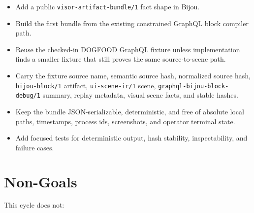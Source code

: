 \begin{itemize}
\tightlist
\item
  Add a public \texttt{v\allowbreak{}i\allowbreak{}s\allowbreak{}o\allowbreak{}r\allowbreak{}-\allowbreak{}a\allowbreak{}r\allowbreak{}t\allowbreak{}i\allowbreak{}f\allowbreak{}a\allowbreak{}c\allowbreak{}t\allowbreak{}-\allowbreak{}b\allowbreak{}u\allowbreak{}n\allowbreak{}d\allowbreak{}l\allowbreak{}e\allowbreak{}/\allowbreak{}1} fact shape in Bijou.
\item
  Build the first bundle from the existing constrained GraphQL block compiler path.
\item
  Reuse the checked-in DOGFOOD GraphQL fixture unless implementation finds a smaller fixture that still proves the same source-to-scene path.
\item
  Carry the fixture source name, semantic source hash, normalized source hash, \texttt{b\allowbreak{}i\allowbreak{}j\allowbreak{}o\allowbreak{}u\allowbreak{}-\allowbreak{}b\allowbreak{}l\allowbreak{}o\allowbreak{}c\allowbreak{}k\allowbreak{}/\allowbreak{}1} artifact, \texttt{u\allowbreak{}i\allowbreak{}-\allowbreak{}s\allowbreak{}c\allowbreak{}e\allowbreak{}n\allowbreak{}e\allowbreak{}-\allowbreak{}i\allowbreak{}r\allowbreak{}/\allowbreak{}1} scene, \texttt{g\allowbreak{}r\allowbreak{}a\allowbreak{}p\allowbreak{}h\allowbreak{}q\allowbreak{}l\allowbreak{}-\allowbreak{}b\allowbreak{}i\allowbreak{}j\allowbreak{}o\allowbreak{}u\allowbreak{}-\allowbreak{}b\allowbreak{}l\allowbreak{}o\allowbreak{}c\allowbreak{}k\allowbreak{}-\allowbreak{}d\allowbreak{}e\allowbreak{}b\allowbreak{}u\allowbreak{}g\allowbreak{}/\allowbreak{}1} summary, replay metadata, visual scene facts, and stable hashes.
\item
  Keep the bundle JSON-serializable, deterministic, and free of absolute local paths, timestamps, process ids, screenshots, and operator terminal state.
\item
  Add focused tests for deterministic output, hash stability, inspectability, and failure cases.
\end{itemize}

\section{Non-Goals}\label{record-145-non-goals}

This cycle does not:

